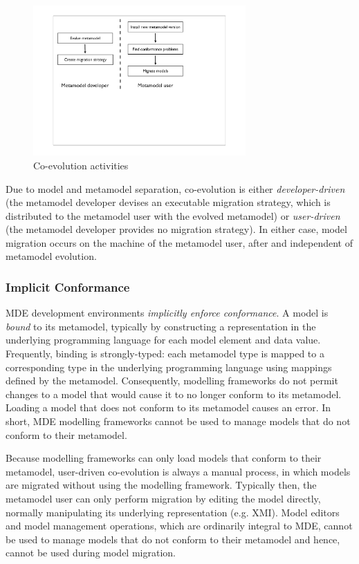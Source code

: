 \begin{figure}[htbp]
	\centering
		\includegraphics*[viewport=80 250 600 550,height=5.75cm]{4.Analysis/images/co-evo_activities.pdf}
	\caption{Co-evolution activities}
	\label{fig:co-evo_activities}
\end{figure}

Due to model and metamodel separation, co-evolution is either \emph{developer-driven} (the metamodel developer devises an executable migration strategy, which is distributed to the metamodel user with the evolved metamodel) or \emph{user-driven} (the metamodel developer provides no migration strategy). In either case, model migration occurs on the machine of the metamodel user, after and independent of metamodel evolution.


\subsubsection{Implicit Conformance}
MDE development environments \emph{implicitly enforce conformance}. A model is \emph{bound} to its metamodel, typically by constructing a representation in the underlying programming language for each model element and data value. Frequently, binding is strongly-typed: each metamodel type is mapped to a corresponding type in the underlying programming language using mappings defined by the metamodel. Consequently, modelling frameworks do not permit changes to a model that would cause it to no longer conform to its metamodel. Loading a model that does not conform to its metamodel causes an error. In short, MDE modelling frameworks cannot be used to manage models that do not conform to their metamodel.

Because modelling frameworks can only load models that conform to their metamodel, user-driven co-evolution is always a manual process, in which models are migrated without using the modelling framework. Typically then, the metamodel user can only perform migration by editing the model directly, normally manipulating its underlying representation (e.g. XMI). Model editors and model management operations, which are ordinarily integral to MDE, cannot be used to manage models that do not conform to their metamodel and hence, cannot be used during model migration.

